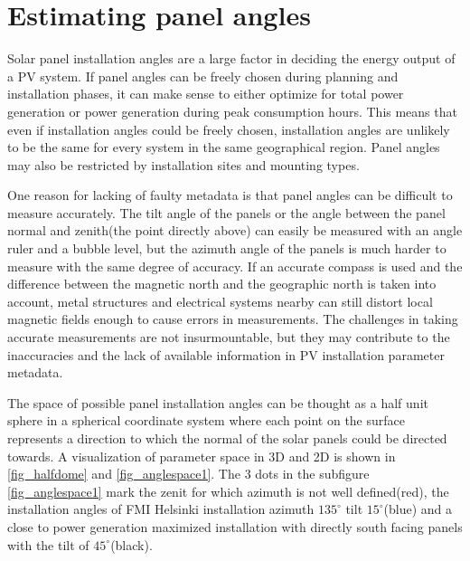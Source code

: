 \chapter{Estimating panel angles}
Solar panel installation angles are a large factor in deciding the energy output of a PV system. If panel angles can be freely chosen during planning and installation phases, it can make sense to either optimize for total power generation or power generation during peak consumption hours. This means that even if installation angles could be freely chosen, installation angles are unlikely to be the same for every system in the same geographical region. Panel angles may also be restricted by installation sites and mounting types.




One reason for lacking of faulty metadata is that panel angles can be difficult to measure accurately. The tilt angle of the panels or the angle between the panel normal and zenith(the point directly above) can easily be measured with an angle ruler and a bubble level, but the azimuth angle of the panels is much harder to measure with the same degree of accuracy. If an accurate compass is used and the difference between the magnetic north and the geographic north is taken into account, metal structures and electrical systems nearby can still distort local magnetic fields enough to cause errors in measurements. The challenges in taking accurate measurements are not insurmountable, but they may contribute to the inaccuracies and the lack of available information in PV installation parameter metadata. 

The space of possible panel installation angles can be thought as a half unit sphere in a spherical coordinate system where each point on the surface represents a direction to which the normal of the solar panels could be directed towards. A visualization of parameter space in 3D and 2D is shown in \ref{fig_halfdome} and \ref{fig_anglespace1}. The 3 dots in the subfigure \ref{fig_anglespace1} mark the zenit for which azimuth is not well defined(red), the installation angles of FMI Helsinki installation azimuth $135^\circ$ tilt $15^\circ$(blue) and a close to power generation maximized installation with directly south facing panels with the tilt of $45^\circ$(black).


